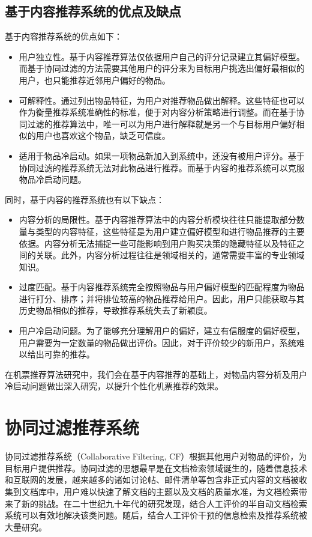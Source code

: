 \subsection{基于内容推荐系统的优点及缺点}

基于内容推荐系统的优点如下：

\begin{itemize}
 \item 用户独立性。基于内容推荐算法仅依据用户自己的评分记录建立其偏好模型。而基于协同过滤的方法需要其他用户的评分来为目标用户挑选出偏好最相似的用户，也只能推荐近邻用户偏好的物品。
 \item 可解释性。通过列出物品特征，为用户对推荐物品做出解释。这些特征也可以作为衡量推荐系统准确性的标准，便于对内容分析策略进行调整。而在基于协同过滤的推荐算法中，唯一可以为用户进行解释就是另一个与目标用户偏好相似的用户也喜欢这个物品，缺乏可信度。
 \item 适用于物品冷启动。如果一项物品新加入到系统中，还没有被用户评分。基于协同过滤的推荐系统无法对此物品进行推荐。而基于内容的推荐系统可以克服物品冷启动问题。
\end{itemize}

同时，基于内容的推荐系统也有以下缺点：

\begin{itemize}
	\item 内容分析的局限性。基于内容推荐算法中的内容分析模块往往只能提取部分数量与类型的内容特征，这些特征是为用户建立偏好模型和进行物品推荐的主要依据。内容分析无法捕捉一些可能影响到用户购买决策的隐藏特征以及特征之间的关联。此外，内容分析过程往往是领域相关的，通常需要丰富的专业领域知识。
	\item 过度匹配。基于内容推荐系统完全按照物品与用户偏好模型的匹配程度为物品进行打分、排序；并将排位较高的物品推荐给用户。因此，用户只能获取与其历史物品相似的推荐，导致推荐系统失去了新颖度。
	\item 用户冷启动问题。为了能够充分理解用户的偏好，建立有信服度的偏好模型，用户需要为一定数量的物品做出评价。因此，对于评价较少的新用户，系统难以给出可靠的推荐。
\end{itemize}

在机票推荐算法研究中，我们会在基于内容推荐的基础上，对物品内容分析及用户冷启动问题做出深入研究，以提升个性化机票推荐的效果。


\section{协同过滤推荐系统}

协同过滤推荐系统（Collaborative Filtering, CF）根据其他用户对物品的评价，为目标用户提供推荐。协同过滤的思想最早是在文档检索领域诞生的\cite{schafer2007collaborative}，随着信息技术和互联网的发展，越来越多的诸如讨论帖、邮件清单等包含非正式内容的文档被收集到文档库中，用户难以快速了解文档的主题以及文档的质量水准，为文档检索带来了新的挑战。在二十世纪九十年代的研究发现，结合人工评价的半自动文档检索系统可以有效地解决该类问题。随后，结合人工评价干预的信息检索及推荐系统被大量研究\cite{goldberg1992using}。

